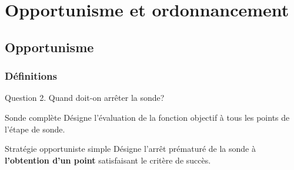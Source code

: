 \documentclass{beamer}
\begin{document}
\section{Opportunisme et ordonnancement}
\tableofcontents[currentsection,currentsubsection,subsectionstyle=show/hide]
\subsection{Opportunisme}
\begin{frame}
\frametitle{Définitions}
\begin{exampleblock}{Question 2.}
Quand doit-on arrêter la sonde?
\end{exampleblock}
\pause
\bigskip

\pause
\bigskip

{\begin{block}{Sonde complète}
Désigne l'évaluation de la fonction objectif à tous les points de l'étape de sonde.
\end{block}}
\pause
\bigskip

\begin{block}{Stratégie opportuniste simple}
	Désigne l'arrêt prématuré de la sonde à \textbf{l'obtention d'un point} satisfaisant le critère de succès. 
\end{block}
\end{frame}
\end{document}
